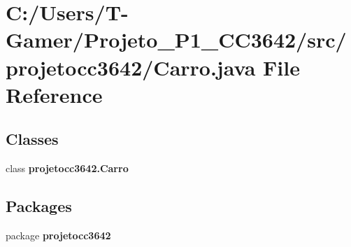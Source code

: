 \section{C\+:/\+Users/\+T-\/\+Gamer/\+Projeto\+\_\+\+P1\+\_\+\+C\+C3642/src/projetocc3642/\+Carro.java File Reference}
\label{_carro_8java}
\subsection*{Classes}
\begin{DoxyCompactItemize}
\item 
class \textbf{ projetocc3642.\+Carro}
\end{DoxyCompactItemize}
\subsection*{Packages}
\begin{DoxyCompactItemize}
\item 
package \textbf{ projetocc3642}
\end{DoxyCompactItemize}
